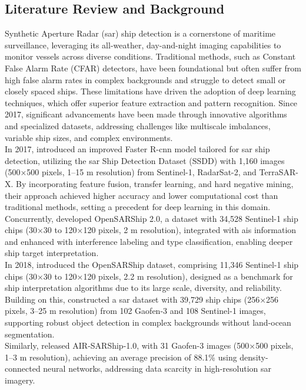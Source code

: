 \documentclass{article}
\begin{document}
	\subsection{Literature Review and Background}
	Synthetic Aperture Radar (\acrshort{sar}) ship detection is a cornerstone of maritime surveillance, leveraging its all-weather, day-and-night imaging capabilities to monitor vessels across diverse conditions. Traditional methods, such as Constant False Alarm Rate (CFAR) detectors, have been foundational but often suffer from high false alarm rates in complex backgrounds and struggle to detect small or closely spaced ships. These limitations have driven the adoption of deep learning techniques, which offer superior feature extraction and pattern recognition. Since 2017, significant advancements have been made through innovative algorithms and specialized datasets, addressing challenges like multiscale imbalances, variable ship sizes, and complex environments. \\
	
	In 2017, \cite{8124934} introduced an improved Faster R-\acrshort{cnn} model tailored for \acrshort{sar} ship detection, utilizing the \acrshort{sar} Ship Detection Dataset (SSDD) with 1,160 images (500×500 pixels, 1–15 m resolution) from Sentinel-1, RadarSat-2, and TerraSAR-X. By incorporating feature fusion, transfer learning, and hard negative mining, their approach achieved higher accuracy and lower computational cost than traditional methods, setting a precedent for deep learning in this domain. Concurrently, \cite{8067489} developed OpenSARShip 2.0, a dataset with 34,528 Sentinel-1 ship chips (30×30 to 120×120 pixels, 2 m resolution), integrated with \acrshort{ais} information and enhanced with interference labeling and type classification, enabling deeper ship target interpretation.\\
	
	In 2018, \cite{8124929} introduced the OpenSARShip dataset, comprising 11,346 Sentinel-1 ship chips (30×30 to 120×120 pixels, 2.2 m resolution), designed as a benchmark for ship interpretation algorithms due to its large scale, diversity, and reliability. Building on this, \cite{rs11070765} constructed a \acrshort{sar} dataset with 39,729 ship chips (256×256 pixels, 3–25 m resolution) from 102 Gaofen-3 and 108 Sentinel-1 images, supporting robust object detection in complex backgrounds without land-ocean segmentation. \\
	
	Similarly, \cite{R19097} released AIR-SARShip-1.0, with 31 Gaofen-3 images (500×500 pixels, 1–3 m resolution), achieving an average precision of 88.1\% using density-connected neural networks, addressing data scarcity in high-resolution \acrshort{sar} imagery. \\
	
\end{document}
